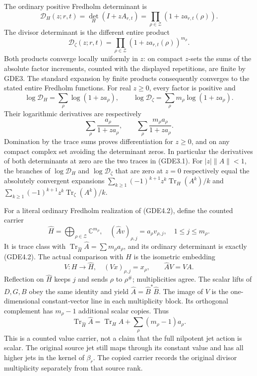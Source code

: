 The ordinary positive Fredholm determinant is \[
\mathcal D_H(z;r,t)=\det_H(I+zA_{r,t})
=\prod_{\rho\in\mathscr Z}(1+za_{r,t}(\rho)).
\tag{GDE4.1}
\] The divisor determinant is the different entire product \[
\boxed{\mathcal D_\zeta(z;r,t)
=\prod_{\rho\in\mathscr Z}(1+za_{r,t}(\rho))^{m_\rho}.}
\tag{GDE4.2}
\] Both products converge locally uniformly in \(z\): on compact
\(z\)-sets the sums of the absolute factor increments, counted with the
displayed repetitions, are finite by GDE3. The standard expansion by
finite products consequently converges to the stated entire Fredholm
functions. For real \(z\ge0\), every factor is positive and \[
\log\mathcal D_H=\sum_\rho\log(1+za_\rho),\qquad
\log\mathcal D_\zeta=\sum_\rho m_\rho\log(1+za_\rho).
\tag{GDE4.3}
\] Their logarithmic derivatives are respectively \[
\sum_\rho\frac{a_\rho}{1+za_\rho},\qquad
\sum_\rho\frac{m_\rho a_\rho}{1+za_\rho}.
\tag{GDE4.4}
\] Domination by the trace sums proves differentiation for \(z\ge0\),
and on any compact complex set avoiding the determinant zeros. In
particular the derivatives of both determinants at zero are the two
traces in (GDE3.1). For \(|z|\|A\|<1\), the branches of
\(\log\mathcal D_H\) and \(\log\mathcal D_\zeta\) that are zero at
\(z=0\) respectively equal the absolutely convergent expansions
\(\sum_{k\ge1}(-1)^{k+1}z^k\operatorname{Tr}_H(A^k)/k\) and
\(\sum_{k\ge1}(-1)^{k+1}z^k\operatorname{Tr}_{\zeta}(A^k)/k\).

For a literal ordinary Fredholm realization of (GDE4.2), define the
counted carrier \[
\widehat H=\bigoplus_{\rho\in\mathscr Z}\mathbb C^{m_\rho},
\quad (\widehat A v)_{\rho,j}=a_\rho v_{\rho,j},\quad 1\le j\le m_\rho.
\tag{GDE4.5}
\] It is trace class with
\(\operatorname{Tr}_{\widehat H}\widehat A=\sum m_\rho a_\rho\), and its
ordinary determinant is exactly (GDE4.2). The actual comparison with
\(H\) is the isometric embedding \[
V:H\to\widehat H,\quad (Vx)_{\rho,j}=x_\rho,
\qquad \widehat A V=VA.
\tag{GDE4.6}
\] Reflection on \(\widehat H\) keeps \(j\) and sends \(\rho\) to
\(\rho^\#\); multiplicities agree. The scalar lifts of \(D,G,B\) obey
the same identity and yield \(\widehat A=\widehat B^*\widehat B\). The
image of \(V\) is the one-dimensional constant-vector line in each
multiplicity block. Its orthogonal complement has \(m_\rho-1\)
additional scalar copies. Thus \[
\operatorname{Tr}_{\widehat H}\widehat A
=\operatorname{Tr}_H A+\sum_\rho(m_\rho-1)a_\rho.
\tag{GDE4.7}
\] This is a counted value carrier, not a claim that the full nilpotent
jet action is scalar. The original source jet still maps through its
constant value and has all higher jets in the kernel of \(\beta_r\). The
copied carrier records the original divisor multiplicity separately from
that source rank.

